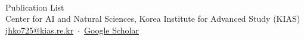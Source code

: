 \documentclass[11pt]{article}
\begin{document}
\begin{center}
  \\[0.35em]
  {\large Publication List}\\[0.35em]
  {\small Center for AI and Natural Sciences, Korea Institute for Advanced Study (KIAS)\\
  \href{mailto:jhko725@kias.re.kr}{jhko725@kias.re.kr} \,$\cdot$\,
  \href{https://scholar.google.com/citations?user=t7lTWNQAAAAJ&hl=en}{Google Scholar}}
\end{center}
\vspace{0.5em}


\end{document}
